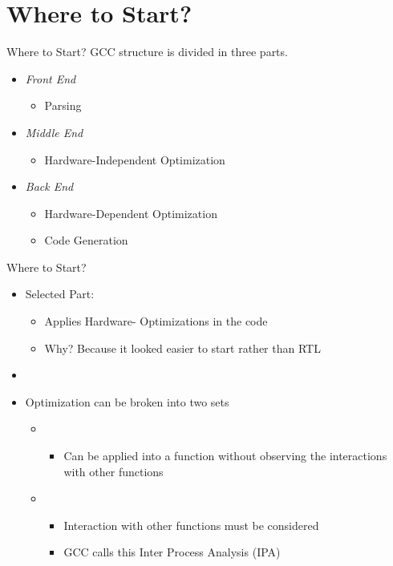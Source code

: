 \section{Where to Start?}

\begin{frame}{Where to Start?}
  GCC structure is divided in three parts.
  \begin{itemize}
    \item \textit{Front End}
        \begin{itemize}
            \item Parsing
        \end{itemize}
    \item \textit{Middle End}
        \begin{itemize}
            \item Hardware-Independent Optimization
        \end{itemize}
    \item \textit{Back End}
        \begin{itemize}
            \item Hardware-Dependent Optimization
            \item Code Generation
        \end{itemize}
  \end{itemize}
\end{frame}

\begin{frame}{Where to Start?}
  \begin{itemize}
    \item Selected Part: {\color{blue}{Middle End}}
    \begin{itemize}
        \item Applies Hardware-{\color{blue}{Independent}} Optimizations in the code
        \item Why? Because it looked easier to start rather than RTL
    \end{itemize}
    \item[]
    \item Optimization can be broken into two {\color{red}{disjoint}} sets
        \begin{itemize}
            \item {\color{blue}{Intra Procedural}}
                \begin{itemize}
                    \item Can be applied into a function without observing the interactions with other functions
                \end{itemize}
            \item {\color{red}{Inter Procedural}}
                \begin{itemize}
                    \item Interaction with other functions must be considered
                    \item GCC calls this Inter Process Analysis (IPA)
                \end{itemize}
        \end{itemize}
  \end{itemize}
\end{frame}


